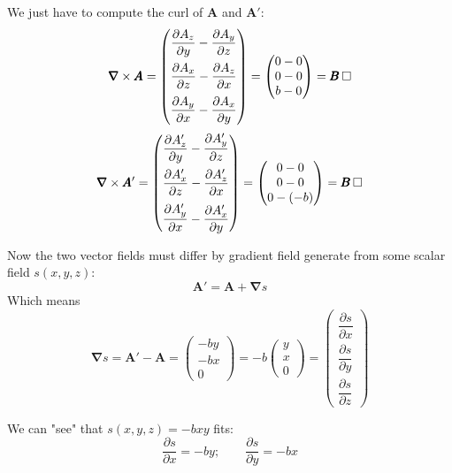 \documentclass[solutions.tex]{subfiles}
\begin{document}
We just have to compute the curl of $\bm{A}$ and $\bm{A}'$:
\[
	\bm\nabla\times \bm{A} = \begin{pmatrix}
		\dfrac{\partial A_z}{\partial y} - \dfrac{\partial A_y}{\partial z} \\[1em]
		\dfrac{\partial A_x}{\partial z} - \dfrac{\partial A_z}{\partial x} \\[1em]
		\dfrac{\partial A_y}{\partial x} - \dfrac{\partial A_x}{\partial y}
	\end{pmatrix} = \begin{pmatrix}
		0 - 0 \\
		0 - 0 \\
		b - 0
	\end{pmatrix} = \bm{B}\qed
\]
\[
	\bm\nabla\times \bm{A}' = \begin{pmatrix}
		\dfrac{\partial A'_z}{\partial y} - \dfrac{\partial A'_y}{\partial z} \\[1em]
		\dfrac{\partial A'_x}{\partial z} - \dfrac{\partial A'_z}{\partial x} \\[1em]
		\dfrac{\partial A'_y}{\partial x} - \dfrac{\partial A'_x}{\partial y}
	\end{pmatrix} = \begin{pmatrix}
		0 - 0 \\
		0 - 0 \\
		0 - (-b)
	\end{pmatrix} = \bm{B}\qed
\]

Now the two vector fields must differ by gradient field generate from some scalar
field $s(x, y, z)$:
\[
	\bm{A}' = \bm{A} + \bm\nabla s
\]
Which means
\[
	\bm\nabla s = \bm{A}'-\bm{A} = \begin{pmatrix}
		-by \\
		-bx \\
		0
	\end{pmatrix} = -b \begin{pmatrix}
		y \\
		x \\
		0
	\end{pmatrix} = \begin{pmatrix}
		\dfrac{\partial s}{\partial x} \\[1em]
		\dfrac{\partial s}{\partial y} \\[1em]
		\dfrac{\partial s}{\partial z}
	\end{pmatrix}
\]

We can "see" that $s(x, y, z) = -b xy$ fits:
\[
	\dfrac{\partial s}{\partial x} = -by;\qquad
	\dfrac{\partial s}{\partial y} = -bx
\]
\end{document}
